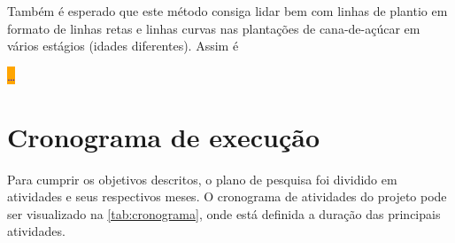 \documentclass[12pt, a4paper, english, brazil]{article}
\newcommand{\dotsBlue}{\colorbox{orange}{\textcolor{blue}{\dots}}}
\begin{document}
Também é esperado que este método consiga lidar bem com linhas de plantio em formato de linhas retas e linhas curvas nas plantações de cana-de-açúcar em vários estágios (idades diferentes). Assim é

\dotsBlue



\section{Cronograma de execução}

Para cumprir os objetivos descritos, o plano de pesquisa foi dividido em atividades e seus respectivos meses. O cronograma de atividades do projeto pode ser visualizado na \autoref{tab:cronograma}, onde está definida a
duração das principais atividades.
\end{document}
